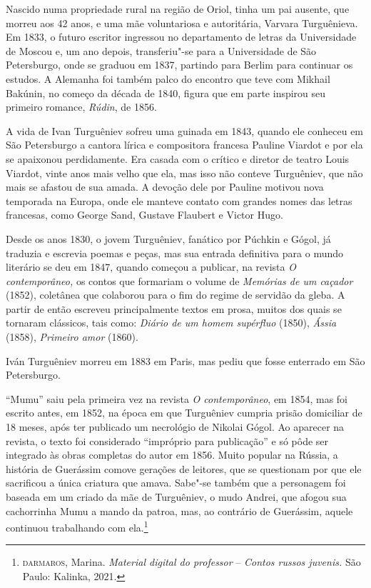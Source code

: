 Nascido numa propriedade rural na região de Oriol, tinha um pai ausente,
que morreu aos 42 anos, e uma mãe voluntariosa e autoritária, Varvara
Turguênieva. Em 1833, o futuro escritor ingressou no
departamento de letras da Universidade de Moscou e, um ano depois,
transferiu"-se para a Universidade de São Petersburgo, onde se graduou em
1837, partindo para Berlim para continuar os estudos. A Alemanha foi
também palco do encontro que teve com Mikhail Bakúnin, no começo da
década de 1840, figura que em parte inspirou seu primeiro
romance, \emph{Rúdin}, de 1856.

A vida de Ivan Turguêniev sofreu uma guinada em 1843, quando ele
conheceu em São Petersburgo a cantora lírica e compositora francesa
Pauline Viardot e por ela se apaixonou perdidamente. Era casada com o
crítico e diretor de teatro Louis Viardot, vinte anos mais velho que
ela, mas isso não conteve Turguêniev, que não mais se afastou de sua
amada. A devoção dele por Pauline motivou nova temporada na Europa, onde
ele manteve contato com grandes nomes das letras francesas, como George
Sand, Gustave Flaubert e Victor Hugo.

Desde os anos 1830, o jovem Turguêniev, fanático por Púchkin e Gógol, já traduzia e
escrevia poemas e peças, mas sua entrada definitiva para o mundo
literário se deu em 1847, quando começou a publicar, na revista \emph{O
contemporâneo,} os contos que formariam o volume de \emph{Memórias de um
caçador} (1852), coletânea que colaborou para o fim do regime de
servidão da gleba. A partir de então escreveu principalmente
textos em prosa, muitos dos quais se tornaram clássicos, tais como:
\emph{Diário de um homem supérfluo} (1850), \emph{Ássia} (1858), \emph{Primeiro amor} (1860).

Iván Turguêniev morreu em 1883 em Paris, mas pediu que fosse enterrado
em São Petersburgo.

``Mumu'' saiu pela primeira vez na revista \emph{O contemporâneo}, em
1854, mas foi escrito antes, em 1852, na época em que Turguêniev cumpria
prisão domiciliar de 18 meses, após ter publicado um necrológio de
Nikolai Gógol. Ao aparecer na revista, o texto foi considerado
``impróprio para publicação'' e só pôde ser integrado às obras completas
do autor em 1856. Muito popular na Rússia, a história de Guerássim
comove gerações de leitores, que se questionam por que ele sacrificou a
única criatura que amava. Sabe"-se também que a personagem foi baseada em
um criado da mãe de Turguêniev, o mudo Andrei, que afogou sua
cachorrinha Mumu a mando da patroa, mas, ao contrário de Guerássim, aquele
continuou trabalhando com ela.\footnote{\scriptsize\textsc{darmaros}, Marina. \emph{Material digital do professor} -- \emph{Contos russos juvenis.} São Paulo: Kalinka, 2021.}

